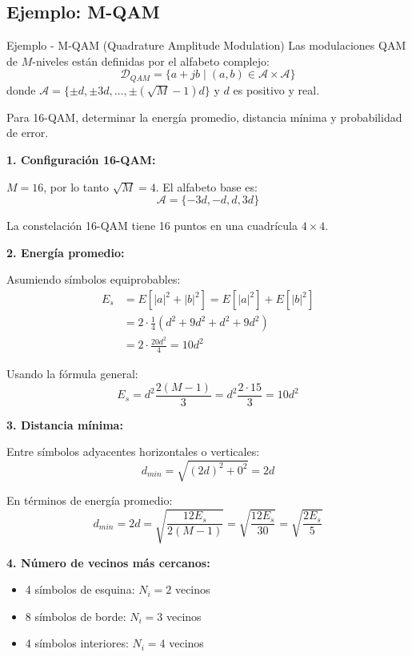 \documentclass[10pt,a4paper]{article}
\begin{document}
\newpage
\subsection{Ejemplo: M-QAM}

\begin{ejemplo}{Ejemplo - M-QAM (Quadrature Amplitude Modulation)}
Las modulaciones QAM de $M$-niveles están definidas por el alfabeto complejo:
\[
\mathcal{D}_{QAM} = \{a + jb \mid (a,b) \in \mathcal{A} \times \mathcal{A}\}
\]
donde $\mathcal{A} = \{\pm d, \pm 3d, \ldots, \pm(\sqrt{M}-1)d\}$ y $d$ es positivo y real.

Para 16-QAM, determinar la energía promedio, distancia mínima y probabilidad de error.
\end{ejemplo}

\begin{solucion}
\textbf{1. Configuración 16-QAM:}

$M = 16$, por lo tanto $\sqrt{M} = 4$. El alfabeto base es:
\[
\mathcal{A} = \{-3d, -d, d, 3d\}
\]

La constelación 16-QAM tiene 16 puntos en una cuadrícula $4 \times 4$.

\textbf{2. Energía promedio:}

Asumiendo símbolos equiprobables:
\begin{align*}
E_s &= E[|a|^2 + |b|^2] = E[|a|^2] + E[|b|^2]\\
&= 2 \cdot \frac{1}{4}(d^2 + 9d^2 + d^2 + 9d^2)\\
&= 2 \cdot \frac{20d^2}{4} = 10d^2
\end{align*}

Usando la fórmula general:
\[
\boxed{E_s = d^2 \frac{2(M-1)}{3} = d^2 \frac{2 \cdot 15}{3} = 10d^2}
\]

\textbf{3. Distancia mínima:}

Entre símbolos adyacentes horizontales o verticales:
\[
d_{min} = \sqrt{(2d)^2 + 0^2} = 2d
\]

En términos de energía promedio:
\[
\boxed{d_{min} = 2d = \sqrt{\frac{12E_s}{2(M-1)}} = \sqrt{\frac{12E_s}{30}} = \sqrt{\frac{2E_s}{5}}}
\]

\textbf{4. Número de vecinos más cercanos:}

\begin{itemize}
\item 4 símbolos de esquina: $N_i = 2$ vecinos
\item 8 símbolos de borde: $N_i = 3$ vecinos
\item 4 símbolos interiores: $N_i = 4$ vecinos
\end{itemize}


\end{solucion}
\end{document}
